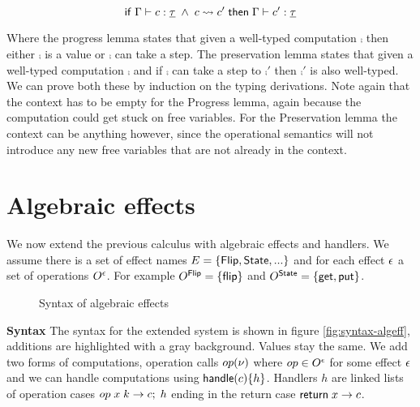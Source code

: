 {\begin{lemma}[Preservation]
\[
	\mathsf{if}\;
		\Gamma \vdash c : \underline{\tau}
		\;\land\;
		c \rightsquigarrow c'
	\;\mathsf{then}\;
		\Gamma \vdash c' : \underline{\tau}
\]
\end{lemma}

Where the progress lemma states that given a well-typed computation $\comp$ then either $\comp$ is a value or $\comp$ can take a  step. The preservation lemma states that given a well-typed computation $\comp$ and if $\comp$ can take a step to $\comp'$ then $\comp'$ is also well-typed. We can prove both these by induction on the typing derivations. Note again that the context has to be empty for the Progress lemma, again because the computation could get stuck on free variables. For the Preservation lemma the context can be anything however, since the operational semantics will not introduce any new free variables that are not already in the context.

\newpage
\section{Algebraic effects} \label{section:algeff}

We now extend the previous calculus with algebraic effects and handlers.
We assume there is a set of effect names $E = \{ \mathsf{Flip}, \mathsf{State}, ... \}$ and for each effect $\epsilon$ a set of operations $O^{\epsilon}$.
For example $O^{\mathsf{Flip}} = \{ \mathsf{flip} \}$ and $O^{\mathsf{State}} = \{ \mathsf{get}, \mathsf{put} \}$.

\begin{figure}
\caption{Syntax of algebraic effects}
\centering
{}
\end{figure}

\textbf{Syntax}
The syntax for the extended system is shown in figure \ref{fig:syntax-algeff}, additions are highlighted with a gray background.
Values stay the same. We add two forms of computations, operation calls $op(\nu)$ where $op \in O^{\epsilon}$ for some effect $\epsilon$ and
we can handle computations using $\mathsf{handle} (c) \{ h \}$.
Handlers $h$ are linked lists of operation cases $op \; x \; k \rightarrow c ; \; h$ ending in the return case $\mathsf{return}\; x \rightarrow c$.

}
